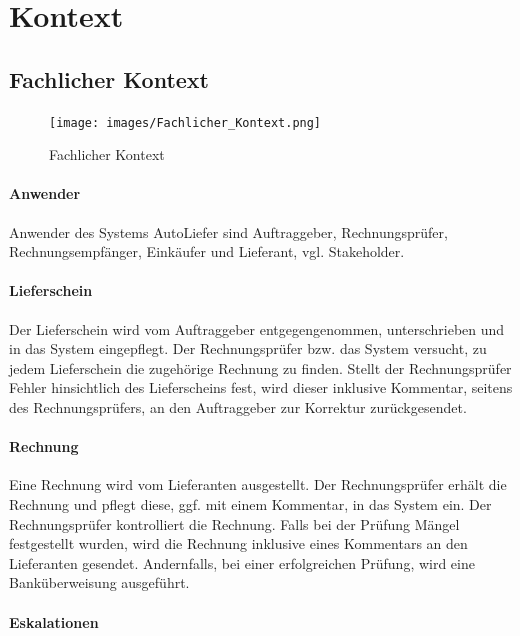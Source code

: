 \section{Kontext}\label{section-system-scope-and-context}

\subsection{Fachlicher Kontext}

\begin{figure}
  \centering
  \texttt{[image: images/Fachlicher\_Kontext.png]}
  \caption{Fachlicher Kontext}
  \label{fig:Fachlicher_Kontext}
\end{figure}

\paragraph{Anwender}

Anwender des Systems AutoLiefer sind Auftraggeber, Rechnungsprüfer, Rechnungsempfänger, Einkäufer und Lieferant, vgl. Stakeholder.

\paragraph{Lieferschein}

Der Lieferschein wird vom Auftraggeber entgegengenommen, unterschrieben und in das System eingepflegt. Der Rechnungsprüfer bzw. das System versucht, zu jedem Lieferschein die zugehörige Rechnung zu finden. Stellt der Rechnungsprüfer Fehler hinsichtlich des Lieferscheins fest, wird dieser inklusive Kommentar, seitens des Rechnungsprüfers, an den Auftraggeber zur Korrektur zurückgesendet.

\paragraph{Rechnung}

Eine Rechnung wird vom Lieferanten ausgestellt. Der Rechnungsprüfer erhält die Rechnung und pflegt diese, ggf. mit einem Kommentar, in das System ein. Der Rechnungsprüfer kontrolliert die Rechnung. Falls bei der Prüfung Mängel festgestellt wurden, wird die Rechnung inklusive eines Kommentars an den Lieferanten gesendet. Andernfalls, bei einer erfolgreichen Prüfung, wird eine Banküberweisung ausgeführt.

\paragraph{Eskalationen}

